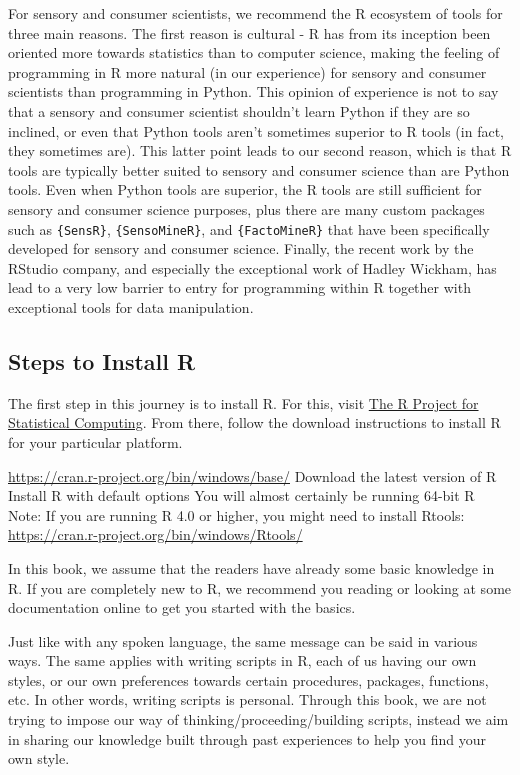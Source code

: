 \documentclass[
]{book}
\begin{document}
For sensory and consumer scientists, we recommend the R ecosystem of tools for three main reasons. The first reason is cultural - R has from its inception been oriented more towards statistics than to computer science, making the feeling of programming in R more natural (in our experience) for sensory and consumer scientists than programming in Python. This opinion of experience is not to say that a sensory and consumer scientist shouldn't learn Python if they are so inclined, or even that Python tools aren't sometimes superior to R tools (in fact, they sometimes are). This latter point leads to our second reason, which is that R tools are typically better suited to sensory and consumer science than are Python tools. Even when Python tools are superior, the R tools are still sufficient for sensory and consumer science purposes, plus there are many custom packages such as \texttt{\{SensR\}}, \texttt{\{SensoMineR\}}, and \texttt{\{FactoMineR\}} that have been specifically developed for sensory and consumer science. Finally, the recent work by the RStudio company, and especially the exceptional work of Hadley Wickham, has lead to a very low barrier to entry for programming within R together with exceptional tools for data manipulation.

\hypertarget{steps-to-install-r}{%
\subsection{Steps to Install R}\label{steps-to-install-r}}

The first step in this journey is to install R. For this, visit \href{https://www.r-project.org/}{The R Project for Statistical Computing}. From there, follow the download instructions to install R for your particular platform.

\url{https://cran.r-project.org/bin/windows/base/}
Download the latest version of R
Install R with default options
You will almost certainly be running 64-bit R
Note: If you are running R 4.0 or higher, you might need to install Rtools:
\url{https://cran.r-project.org/bin/windows/Rtools/}

In this book, we assume that the readers have already some basic knowledge in R.
If you are completely new to R, we recommend you reading or looking at some documentation online to get you started with the basics.

Just like with any spoken language, the same message can be said in various ways. The same applies with writing scripts in R, each of us having our own styles, or our own preferences towards certain procedures, packages, functions, etc. In other words, writing scripts is personal. Through this book, we are not trying to impose our way of thinking/proceeding/building scripts, instead we aim in sharing our knowledge built through past experiences to help you find your own style.
\end{document}
